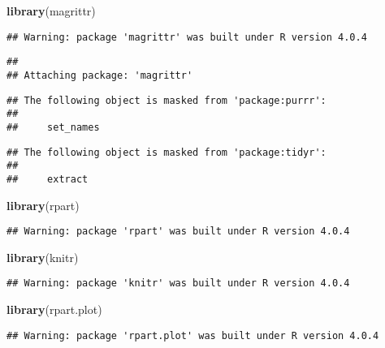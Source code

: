 \documentclass[
]{article}
\newenvironment{Shaded}{\begin{snugshade}}{\end{snugshade}}
\newcommand{\KeywordTok}[1]{\textcolor[rgb]{0.13,0.29,0.53}{\textbf{#1}}}
\newcommand{\NormalTok}[1]{#1}
\begin{document}
\begin{Shaded}
\begin{Highlighting}[]
\KeywordTok{library}\NormalTok{(magrittr)}
\end{Highlighting}
\end{Shaded}

\begin{verbatim}
## Warning: package 'magrittr' was built under R version 4.0.4
\end{verbatim}

\begin{verbatim}
## 
## Attaching package: 'magrittr'
\end{verbatim}

\begin{verbatim}
## The following object is masked from 'package:purrr':
## 
##     set_names
\end{verbatim}

\begin{verbatim}
## The following object is masked from 'package:tidyr':
## 
##     extract
\end{verbatim}

\begin{Shaded}
\begin{Highlighting}[]
\KeywordTok{library}\NormalTok{(rpart)}
\end{Highlighting}
\end{Shaded}

\begin{verbatim}
## Warning: package 'rpart' was built under R version 4.0.4
\end{verbatim}

\begin{Shaded}
\begin{Highlighting}[]
\KeywordTok{library}\NormalTok{(knitr)}
\end{Highlighting}
\end{Shaded}

\begin{verbatim}
## Warning: package 'knitr' was built under R version 4.0.4
\end{verbatim}

\begin{Shaded}
\begin{Highlighting}[]
\KeywordTok{library}\NormalTok{(rpart.plot)}
\end{Highlighting}
\end{Shaded}

\begin{verbatim}
## Warning: package 'rpart.plot' was built under R version 4.0.4
\end{verbatim}
\end{document}
